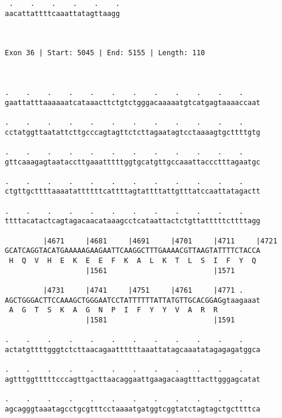 \documentclass{article}
\begin{document}
\begin{Verbatim}
 .    .    .    .    .    .
aacattattttcaaattatagttaagg
                           
                           
 
Exon 36 | Start: 5045 | End: 5155 | Length: 110



.    .    .    .    .    .    .    .    .    .    .    .    
gaattatttaaaaaatcataaacttctgtctgggacaaaaatgtcatgagtaaaaccaat
                                                            
.    .    .    .    .    .    .    .    .    .    .    .    
cctatggttaatattcttgcccagtagttctcttagaatagtcctaaaagtgcttttgtg
                                                            
.    .    .    .    .    .    .    .    .    .    .    .    
gttcaaagagtaataccttgaaatttttggtgcatgttgccaaattaccctttagaatgc
                                                            
.    .    .    .    .    .    .    .    .    .    .    .    
ctgttgcttttaaaatattttttcattttagtattttattgtttatccaattatagactt
                                                            
.    .    .    .    .    .    .    .    .    .    .    .    
ttttacatactcagtagacaacataaagcctcataattactctgttatttttcttttagg
                                                            
         |4671     |4681     |4691     |4701     |4711     |4721
GCATCAGGTACATGAAAAAGAAGAATTCAAGGCTTTGAAAACGTTAAGTATTTTCTACCA
 H  Q  V  H  E  K  E  E  F  K  A  L  K  T  L  S  I  F  Y  Q 
                   |1561                         |1571      
  
         |4731     |4741     |4751     |4761     |4771 .    
AGCTGGGACTTCCAAAGCTGGGAATCCTATTTTTTATTATGTTGCACGGAGgtaagaaat
 A  G  T  S  K  A  G  N  P  I  F  Y  Y  V  A  R  R          
                   |1581                         |1591      
  
.    .    .    .    .    .    .    .    .    .    .    .    
actatgttttgggtctcttaacagaattttttaaattatagcaaatatagagagatggca
                                                            
.    .    .    .    .    .    .    .    .    .    .    .    
agtttggtttttcccagttgacttaacaggaattgaagacaagtttacttgggagcatat
                                                            
.    .    .    .    .    .    .    .    .    .    .    .    
agcagggtaaatagcctgcgtttcctaaaatgatggtcggtatctagtagctgcttttca
                                                            

\end{Verbatim}
\end{document}
